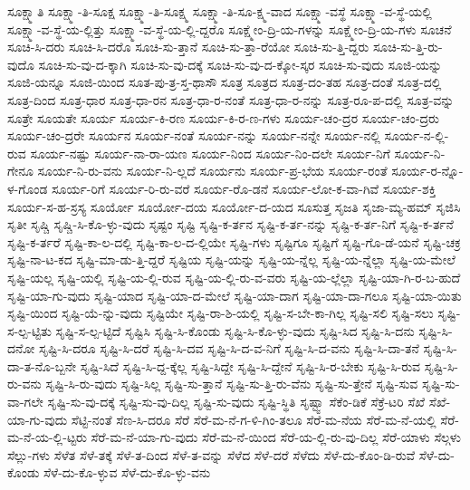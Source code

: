 {ಸೂಕ್ಷ್ಮಾತಿ
ಸೂಕ್ಷ್ಮಾ-ತಿ-ಸೂಕ್ಷ
ಸೂಕ್ಷ್ಮಾ-ತಿ-ಸೂಕ್ಷ್ಮ
ಸೂಕ್ಷ್ಮಾ-ತಿ-ಸೂ-ಕ್ಷ್ಮ-ವಾದ
ಸೂಕ್ಷ್ಮಾ-ವಸ್ಥೆ
ಸೂಕ್ಷ್ಮಾ-ವ-ಸ್ಥೆ-ಯಲ್ಲಿ
ಸೂಕ್ಷ್ಮಾ-ವ-ಸ್ಥೆ-ಯ-ಲ್ಲಿತ್ತು
ಸೂಕ್ಷ್ಮಾ-ವ-ಸ್ಥೆ-ಯ-ಲ್ಲಿ-ದ್ದರೊ
ಸೂಕ್ಷ್ಮೇಂ-ದ್ರಿ-ಯ-ಗಳನ್ನು
ಸೂಕ್ಷ್ಮೇಂ-ದ್ರಿ-ಯ-ಗಳು
ಸೂಚನೆ
ಸೂಚಿ-ಸಿ-ದರು
ಸೂಚಿ-ಸಿ-ದರೊ
ಸೂಚಿ-ಸು-ತ್ತಾನೆ
ಸೂಚಿ-ಸು-ತ್ತಾ-ರೆಯೋ
ಸೂಚಿ-ಸು-ತ್ತಿ-ದ್ದರು
ಸೂಚಿ-ಸು-ತ್ತಿ-ರು-ವುದೊ
ಸೂಚಿ-ಸು-ವು-ದ-ಕ್ಕಾಗಿ
ಸೂಚಿ-ಸು-ವು-ದಕ್ಕೆ
ಸೂಚಿ-ಸು-ವು-ದ-ಕ್ಕೋ-ಸ್ಕರ
ಸೂಚಿ-ಸು-ವುದು
ಸೂಜಿ-ಯನ್ನು
ಸೂಜಿ-ಯನ್ನೂ
ಸೂಜಿ-ಯಿಂದ
ಸೂತ-ಪು-ತ್ರ-ಸ್ತ-ಥಾಸೌ
ಸೂತ್ರ
ಸೂತ್ರದ
ಸೂತ್ರ-ದಂ-ತಹ
ಸೂತ್ರ-ದಂತೆ
ಸೂತ್ರ-ದಲ್ಲಿ
ಸೂತ್ರ-ದಿಂದ
ಸೂತ್ರ-ಧಾರ
ಸೂತ್ರ-ಧಾ-ರನ
ಸೂತ್ರ-ಧಾ-ರ-ನಂತೆ
ಸೂತ್ರ-ಧಾ-ರ-ನನ್ನು
ಸೂತ್ರ-ರೂ-ಪ-ದಲ್ಲಿ
ಸೂತ್ರ-ವನ್ನು
ಸೂತ್ರೇ
ಸೂಯತೇ
ಸೂರ್ಯ
ಸೂರ್ಯ-ಕಿ-ರಣ
ಸೂರ್ಯ-ಕಿ-ರ-ಣ-ಗಳು
ಸೂರ್ಯ-ಚಂ-ದ್ರರ
ಸೂರ್ಯ-ಚಂ-ದ್ರರು
ಸೂರ್ಯ-ಚಂ-ದ್ರರೇ
ಸೂರ್ಯನ
ಸೂರ್ಯ-ನಂತೆ
ಸೂರ್ಯ-ನನ್ನು
ಸೂರ್ಯ-ನನ್ನೇ
ಸೂರ್ಯ-ನಲ್ಲಿ
ಸೂರ್ಯ-ನ-ಲ್ಲಿ-ರುವ
ಸೂರ್ಯ-ನಷ್ಟು
ಸೂರ್ಯ-ನಾ-ರಾ-ಯಣ
ಸೂರ್ಯ-ನಿಂದ
ಸೂರ್ಯ-ನಿಂ-ದಲೇ
ಸೂರ್ಯ-ನಿಗೆ
ಸೂರ್ಯ-ನಿ-ಗೇನೂ
ಸೂರ್ಯ-ನಿ-ರು-ವನು
ಸೂರ್ಯ-ನಿ-ಲ್ಲದೆ
ಸೂರ್ಯನು
ಸೂರ್ಯ-ಪ್ರ-ಭೆಯ
ಸೂರ್ಯ-ರಂತೆ
ಸೂರ್ಯ-ರ-ನ್ನೊ-ಳ-ಗೊಂಡ
ಸೂರ್ಯ-ರಿಗೆ
ಸೂರ್ಯ-ರಿ-ರು-ವರೆ
ಸೂರ್ಯ-ರೊ-ಡನೆ
ಸೂರ್ಯ-ಲೋ-ಕ-ವಾ-ಗಿವೆ
ಸೂರ್ಯ-ಶಕ್ತಿ
ಸೂರ್ಯ-ಸ-ಹ-ಸ್ರಸ್ಯ
ಸೂರ್ಯೋ
ಸೂರ್ಯೋ-ದಯ
ಸೂರ್ಯೋ-ದ-ಯದ
ಸೂಸುತ್ತ
ಸೃಜತಿ
ಸೃಜಾ-ಮ್ಯ-ಹಮ್
ಸೃಜಿಸಿ
ಸೃತೀ
ಸೃಷ್ಚಿ
ಸೃಷ್ಚಿ-ಸಿ-ಕೊ-ಳ್ಳು-ವುದು
ಸೃಷ್ಟಂ
ಸೃಷ್ಟಿ
ಸೃಷ್ಟಿ-ಕ-ರ್ತನ
ಸೃಷ್ಟಿ-ಕ-ರ್ತ-ನನ್ನು
ಸೃಷ್ಟಿ-ಕ-ರ್ತ-ನಿಗೆ
ಸೃಷ್ಟಿ-ಕ-ರ್ತನೆ
ಸೃಷ್ಟಿ-ಕ-ರ್ತರೆ
ಸೃಷ್ಟಿ-ಕಾ-ಲ-ದಲ್ಲಿ
ಸೃಷ್ಟಿ-ಕಾ-ಲ-ದ-ಲ್ಲಿಯೇ
ಸೃಷ್ಟಿ-ಗಳು
ಸೃಷ್ಟಿಗೂ
ಸೃಷ್ಟಿಗೆ
ಸೃಷ್ಟಿ-ಗೊ-ಡೆ-ಯನೆ
ಸೃಷ್ಟಿ-ಚಕ್ರ
ಸೃಷ್ಟಿ-ನಾ-ಟ-ಕದ
ಸೃಷ್ಟಿ-ಮಾ-ಡು-ತ್ತಿ-ದ್ದರೆ
ಸೃಷ್ಟಿಯ
ಸೃಷ್ಟಿ-ಯನ್ನು
ಸೃಷ್ಟಿ-ಯ-ನ್ನೆಲ್ಲ
ಸೃಷ್ಟಿ-ಯ-ನ್ನೆಲ್ಲಾ
ಸೃಷ್ಟಿ-ಯ-ಮೇಲೆ
ಸೃಷ್ಟಿ-ಯಲ್ಲ
ಸೃಷ್ಟಿ-ಯಲ್ಲಿ
ಸೃಷ್ಟಿ-ಯ-ಲ್ಲಿ-ರುವ
ಸೃಷ್ಟಿ-ಯ-ಲ್ಲಿ-ರು-ವ-ವರು
ಸೃಷ್ಟಿ-ಯ-ಲ್ಲೆಲ್ಲಾ
ಸೃಷ್ಟಿ-ಯಾ-ಗಿ-ರ-ಬ-ಹುದೆ
ಸೃಷ್ಟಿ-ಯಾ-ಗು-ವುದು
ಸೃಷ್ಟಿ-ಯಾದ
ಸೃಷ್ಟಿ-ಯಾ-ದ-ಮೇಲೆ
ಸೃಷ್ಟಿ-ಯಾ-ದಾಗ
ಸೃಷ್ಟಿ-ಯಾ-ದಾ-ಗಲೂ
ಸೃಷ್ಟಿ-ಯಾ-ಯಿತು
ಸೃಷ್ಟಿ-ಯಿಂದ
ಸೃಷ್ಟಿ-ಯೆ-ನ್ನು-ವುದು
ಸೃಷ್ಟಿಯೇ
ಸೃಷ್ಟಿ-ರಾ-ಶಿ-ಯಲ್ಲಿ
ಸೃಷ್ಟಿ-ಸ-ಬೇ-ಕಾ-ಗಿಲ್ಲ
ಸೃಷ್ಟಿ-ಸಲಿ
ಸೃಷ್ಟಿ-ಸಲು
ಸೃಷ್ಟಿ-ಸ-ಲ್ಪ-ಟ್ಟಿತು
ಸೃಷ್ಟಿ-ಸ-ಲ್ಪ-ಟ್ಟಿದೆ
ಸೃಷ್ಟಿಸಿ
ಸೃಷ್ಟಿ-ಸಿ-ಕೊಂಡು
ಸೃಷ್ಟಿ-ಸಿ-ಕೊ-ಳ್ಳು-ವುದು
ಸೃಷ್ಟಿ-ಸಿದ
ಸೃಷ್ಟಿ-ಸಿ-ದನು
ಸೃಷ್ಟಿ-ಸಿ-ದನೋ
ಸೃಷ್ಟಿ-ಸಿ-ದರೂ
ಸೃಷ್ಟಿ-ಸಿ-ದರೆ
ಸೃಷ್ಟಿ-ಸಿ-ದವ
ಸೃಷ್ಟಿ-ಸಿ-ದ-ವ-ನಿಗೆ
ಸೃಷ್ಟಿ-ಸಿ-ದ-ವನು
ಸೃಷ್ಟಿ-ಸಿ-ದಾ-ತನೆ
ಸೃಷ್ಟಿ-ಸಿ-ದಾ-ತ-ನೊ-ಬ್ಬನೇ
ಸೃಷ್ಟಿ-ಸಿದೆ
ಸೃಷ್ಟಿ-ಸಿ-ದ್ದ-ಕ್ಕೆಲ್ಲ
ಸೃಷ್ಟಿ-ಸಿದ್ದೇ
ಸೃಷ್ಟಿ-ಸಿ-ದ್ದೇನೆ
ಸೃಷ್ಟಿ-ಸಿ-ರ-ಬೇಕು
ಸೃಷ್ಟಿ-ಸಿ-ರುವ
ಸೃಷ್ಟಿ-ಸಿ-ರು-ವನು
ಸೃಷ್ಟಿ-ಸಿ-ರು-ವುದು
ಸೃಷ್ಟಿ-ಸಿಲ್ಲ
ಸೃಷ್ಟಿ-ಸು-ತ್ತಾನೆ
ಸೃಷ್ಟಿ-ಸು-ತ್ತಿ-ರು-ವೆನು
ಸೃಷ್ಟಿ-ಸು-ತ್ತೇನೆ
ಸೃಷ್ಟಿ-ಸುವ
ಸೃಷ್ಟಿ-ಸು-ವಾ-ಗಲೇ
ಸೃಷ್ಟಿ-ಸು-ವು-ದಕ್ಕೆ
ಸೃಷ್ಟಿ-ಸು-ವು-ದಿಲ್ಲ
ಸೃಷ್ಟಿ-ಸು-ವುದು
ಸೃಷ್ಟಿ-ಸ್ಥಿತಿ
ಸೃಷ್ಟ್ವಾ
ಸೆಕೆಂ-ಡಿಕೆ
ಸೆಕ್ರೆ-ಟರಿ
ಸೆಖೆ
ಸೆಖೆ-ಯಾ-ಗು-ವುದು
ಸೆಟ್ಟಿ-ನಂತೆ
ಸೆಣ-ಸಿ-ದರೂ
ಸೆರೆ
ಸೆರೆ-ಮ-ನೆ-ಗ-ಳಿ-ಗಿಂ-ತಲೂ
ಸೆರೆ-ಮ-ನೆಯ
ಸೆರೆ-ಮ-ನೆ-ಯಲ್ಲಿ
ಸೆರೆ-ಮ-ನೆ-ಯ-ಲ್ಲಿ-ಟ್ಟರು
ಸೆರೆ-ಮ-ನೆ-ಯಾ-ಗು-ವುದು
ಸೆರೆ-ಮ-ನೆ-ಯಿಂದ
ಸೆರೆ-ಯ-ಲ್ಲಿ-ರು-ವು-ದಿಲ್ಲ
ಸೆರೆ-ಯಾಳು
ಸೆಲ್ಗಳು
ಸೆಲ್ಲು-ಗಳು
ಸೆಳೆತ
ಸೆಳೆ-ತಕ್ಕೆ
ಸೆಳೆ-ತ-ದಿಂದ
ಸೆಳೆ-ತ-ವನ್ನು
ಸೆಳೆದ
ಸೆಳೆ-ದರೆ
ಸೆಳೆದು
ಸೆಳೆ-ದು-ಕೊಂ-ಡಿ-ರುವೆ
ಸೆಳೆ-ದು-ಕೊಂಡು
ಸೆಳೆ-ದು-ಕೊ-ಳ್ಳುವ
ಸೆಳೆ-ದು-ಕೊ-ಳ್ಳು-ವನು
}
